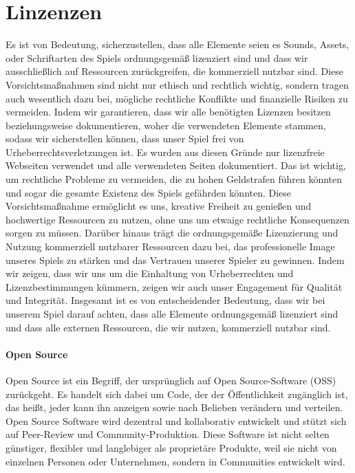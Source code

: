 
\chapter{Linzenzen}\label{ch:lizenzen}
\renewcommand{\kapitelautor}{Autor: Nils Hubmann}

%
Es ist von Bedeutung, sicherzustellen, dass alle Elemente seien es Sounds, Assets, oder Schriftarten des Spiels ordnungsgemäß lizenziert sind und dass wir ausschließlich auf Ressourcen zurückgreifen, die kommerziell nutzbar sind.
Diese Vorsichtsmaßnahmen sind nicht nur ethisch und rechtlich wichtig, sondern tragen auch wesentlich dazu bei, mögliche rechtliche Konflikte und finanzielle Risiken zu vermeiden.
Indem wir garantieren, dass wir alle benötigten Lizenzen besitzen beziehungsweise dokumentieren, woher die verwendeten Elemente stammen, sodass wir sicherstellen können, dass unser Spiel frei von Urheberrechtsverletzungen ist.
Es wurden aus diesen Gründe nur lizenzfreie Webseiten verwendet und alle verwendeten Seiten dokumentiert.
Das ist wichtig, um rechtliche Probleme zu vermeiden, die zu hohen Geldstrafen führen könnten und sogar die gesamte Existenz des Spiels gefährden könnten.
Diese Vorsichtsmaßnahme ermöglicht es uns, kreative Freiheit zu genießen und hochwertige Ressourcen zu nutzen, ohne uns um etwaige rechtliche Konsequenzen sorgen zu müssen.
Darüber hinaus trägt die ordnungsgemäße Lizenzierung und Nutzung kommerziell nutzbarer Ressourcen dazu bei, das professionelle Image unseres Spiels zu stärken und das Vertrauen unserer Spieler zu gewinnen.
Indem wir zeigen, dass wir uns um die Einhaltung von Urheberrechten und Lizenzbestimmungen kümmern, zeigen wir auch unser Engagement für Qualität und Integrität.
Insgesamt ist es von entscheidender Bedeutung, dass wir bei unserem Spiel darauf achten, dass alle Elemente ordnungsgemäß lizenziert sind und dass alle externen Ressourcen, die wir nutzen, kommerziell nutzbar sind.
%
\subsubsection{Open Source}\label{subsubsec:Open-Source}
%

\begin{coolQuote}
Open Source ist ein Begriff, der ursprünglich auf Open Source-Software (OSS) zurückgeht.
Es handelt sich dabei um Code, der der Öffentlichkeit zugänglich ist, das heißt, jeder kann ihn anzeigen sowie nach Belieben verändern und verteilen.
Open Source Software wird dezentral und kollaborativ entwickelt und stützt sich auf Peer-Review und Community-Produktion.
Diese Software ist nicht selten günstiger, flexibler und langlebiger als proprietäre Produkte, weil sie nicht von einzelnen Personen oder Unternehmen, sondern in Communities entwickelt wird.
\end{coolQuote}

